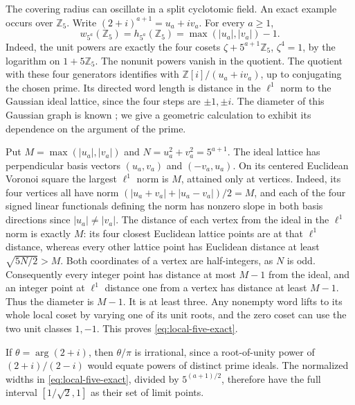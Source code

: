 \documentclass[11pt,letterpaper]{article}
\theoremstyle{definition}
\numberwithin{equation}{section}
\begin{document}
The covering radius can oscillate in a split cyclotomic field.
An exact example occurs over $\mathbb Z_5$. Write
$(2+i)^{a+1}=u_a+i v_a$. For every $a\ge1$,
\begin{equation}\label{eq:local-five-exact}
       w_{5^a}(\mathbb Z_5)=h_{5^a}(\mathbb Z_5)
                    =\max(|u_a|,|v_a|)-1 .
\end{equation}
Indeed, the unit powers are exactly the four cosets
$\zeta+5^{a+1}\mathbb Z_5$, $\zeta^4=1$, by the logarithm on
$1+5\mathbb Z_5$. The nonunit powers vanish in the quotient.
The quotient with these four generators identifies with
$\mathbb Z[i]/(u_a+i v_a)$, up to conjugating the chosen prime.
Its directed word length is distance in the $\ell^1$ norm to the
Gaussian ideal lattice, since the four steps are $\pm1,\pm i$. The
diameter of this Gaussian graph is known \cite{edgaussian}; we give a
geometric calculation to exhibit its dependence on the argument of the prime.

Put $M=\max(|u_a|,|v_a|)$ and $N=u_a^2+v_a^2=5^{a+1}$.
The ideal lattice has perpendicular basis vectors $(u_a,v_a)$ and
$(-v_a,u_a)$. On its centered Euclidean Voronoi square the largest
$\ell^1$ norm is $M$, attained only at vertices. Indeed, its four
vertices all have norm
$(|u_a+v_a|+|u_a-v_a|)/2=M$, and each of the four signed linear
functionals defining the norm has nonzero slope in both basis
directions since $|u_a|\ne|v_a|$. The distance of each vertex from
the ideal in the $\ell^1$ norm is exactly $M$: its four closest
Euclidean lattice points are at that $\ell^1$ distance, whereas every
other lattice point has Euclidean distance at least $\sqrt{5N/2}>M$.
Both coordinates of a vertex are half-integers, as $N$ is odd.
Consequently every integer point has distance at most $M-1$ from
the ideal, and an integer point at $\ell^1$ distance one from a
vertex has distance at least $M-1$. Thus the diameter is $M-1$.
It is at least three. Any nonempty word lifts to its whole local
coset by varying one of its unit roots, and the zero coset can use
the two unit classes $1,-1$. This proves \eqref{eq:local-five-exact}.

If $\theta=\arg(2+i)$, then $\theta/\pi$ is irrational, since a
root-of-unity power of $(2+i)/(2-i)$ would equate powers of distinct
prime ideals. The normalized widths in \eqref{eq:local-five-exact},
divided by $5^{(a+1)/2}$, therefore have the full interval
$[1/\sqrt2,1]$ as their set of limit points.
\end{document}
